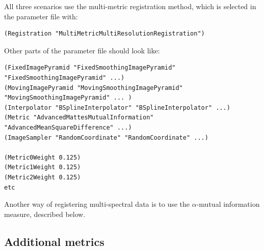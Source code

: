 \documentclass[]{report}
\begin{document}
All three scenarios use the multi-metric registration method, which
is selected in the parameter file with:
\small
\begin{verbatim}
(Registration "MultiMetricMultiResolutionRegistration")
\end{verbatim}
\normalsize Other parts of the parameter file should look like:
\small
\begin{verbatim}
(FixedImagePyramid "FixedSmoothingImagePyramid" "FixedSmoothingImagePyramid" ...)
(MovingImagePyramid "MovingSmoothingImagePyramid" "MovingSmoothingImagePyramid" ... )
(Interpolator "BSplineInterpolator" "BSplineInterpolator" ...)
(Metric "AdvancedMattesMutualInformation" "AdvancedMeanSquareDifference" ...)
(ImageSampler "RandomCoordinate" "RandomCoordinate" ...)

(Metric0Weight 0.125)
(Metric1Weight 0.125)
(Metric2Weight 0.125)
etc
\end{verbatim}
\normalsize

Another way of registering multi-spectral data is to use the
$\alpha$-mutual information measure, described below.

\subsection{Additional metrics}
\end{document}
